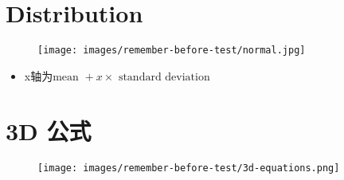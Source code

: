 \section{Distribution}

  \begin{figure}[H]
    \centering
    \texttt{[image: images/remember-before-test/normal.jpg]}
  \end{figure}

  \begin{itemize}
    \item x轴为$ \text{mean } + x \times \text{ standard deviation} $
  \end{itemize}

\section{3D 公式}

  \begin{figure}[H]
    \centering
    \texttt{[image: images/remember-before-test/3d-equations.png]}
  \end{figure}
